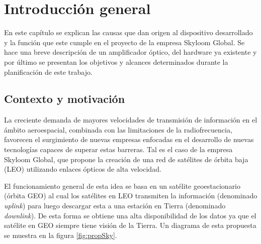 
\chapter{Introducción general} %

\label{Chapter1} %
\label{IntroGeneral}


\newcommand{\keyword}[1]{\textbf{#1}}
\newcommand{\tabhead}[1]{\textbf{#1}}
\newcommand{\code}[1]{\texttt{#1}}
\newcommand{\file}[1]{\texttt{\bfseries#1}}
\newcommand{\option}[1]{\texttt{\itshape#1}}
\newcommand{\grados}{$^{\circ}$}


En este capítulo se explican las causas que dan origen al dispositivo desarrollado y la función que este cumple en el proyecto de la empresa Skyloom Global. Se hace una breve descripción de un amplificador óptico, del hardware ya existente y por último se presentan los objetivos y alcances determinados durante la planificación de este trabajo.


\section{Contexto y motivación}
\label{sec:contexto}

La creciente demanda de mayores velocidades de transmisión de información en el ámbito aeroespacial, combinada con las limitaciones de la radiofrecuencia, favorecen el surgimiento de nuevas empresas enfocadas en el desarrollo de nuevas tecnologías capaces de superar estas barreras. Tal es el caso de la empresa Skyloom Global, que propone la creación de una red de satélites de órbita baja (LEO) utilizando enlaces ópticos de alta velocidad.

El funcionamiento general de esta idea se basa en un satélite geoestacionario (órbita GEO) al cual los satélites en LEO transmiten la información (denominado \textit{uplink}) para luego descargar esta a una estación en Tierra (denominado \textit{downlink}). De esta forma se obtiene una alta disponibilidad de los datos ya que el satélite en GEO siempre tiene visión de la Tierra. Un diagrama de esta propuesta se muestra en la figura \ref{fig:propSky}.


